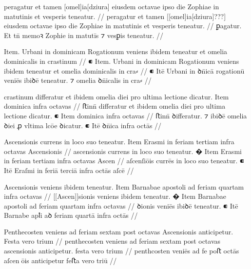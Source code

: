 \ex \bg
\gla
{}
peragatur
et tamen [omel]ia[dziura] eiusdem octavae ipso die Zophiae in matutinis et
vesperis teneatur.
//
\glRekonstrukcja
{}
peragatur
et tamen [[omel]ia[dziura]???] eiusdem octavae ipso die Zophiae in matutinis et
vesperis teneatur.
//
\glU
{}
ꝑagatur. Et tn̄ memoꝛ     Zophie in matutīs ⁊ vesꝑis teneatur.
//
\endgl
\eg


\ex \bg
\gla
{}
{} Item. Urbani in dominicam Rogationum veniens ibidem teneatur
et omelia dominicalis in crastinum
//
\glRekonstrukcja
{}
⁌ Item. Urbani in dominicam Rogationum veniens ibidem teneatur
et omelia dominicalis in cra⸗
//
\glU
{}
⁌ Itē Urbani in ꝺn̄icā rogationū veniēs ibiꝺē teneatur. ⁊ omelia ꝺn̄icalis in cra⸗
//
\endgl
\eg



\ex \bg
\gla
{}
crastinum differatur et ibidem omelia diei pro
ultima lectione dicatur.
{} Item dominica infra octavas
//
\glRekonstrukcja
{}
ﬅinn̄ differatur et ibidem omelia diei pro
ultima lectione dicatur.
⁌ Item dominica infra octavas
//
\glU
{}
ﬅinn̄ ꝺiﬀeratur. ⁊ ibiꝺē omelia ꝺiei ꝓ vltima lcōe ꝺicatur. ⁌ Itē ꝺn̄ica infra octās
//
\endgl
\eg



\ex \bg
\gla
{}
Ascensionis currens in loco suo teneatur.
{} Item Erasmi in feriam tertiam infra octavas Ascensionis
//
\glRekonstrukcja
{}
ascensionis currens in loco suo teneatur.
� Item Erasmi in feriam tertiam infra octavas Ascen
//
\glU
{}
{}
aſcenſiōis currēs in loco suo teneatur. ⁌ Itē Eraſmi in feriā terciā infra octās aſcē
//
\endgl
\eg



\ex \bg
\gla
{}
Ascensionis veniens
ibidem teneatur. 
{} Item Barnabae apostoli ad feriam quartam infra octavas
//
\glRekonstrukcja
{}
[[Ascen]]sionis veniens
ibidem teneatur. � Item Barnabae apostoli ad feriam quartam infra octavas
//
\glU
{}
ꝺionis veniēs ibiꝺē teneatur. ⁌ Itē Barnabe apꝉi aꝺ feriam quartā infra octās
//
\endgl
\eg



\ex \bg
\gla
{}
Penthecosten veniens ad feriam sextam post octavas Ascensionis anticipetur.
Festa vero trium
//
\glRekonstrukcja
{}
penthecosten veniens ad feriam sextam post octavas ascensionis anticipetur.
festa vero trium
//
\glU
{}
penthcosten veniēs ad fe   poﬅ octās aſcenōis anticipetur feﬅa vero triū
//
\endgl
\eg




